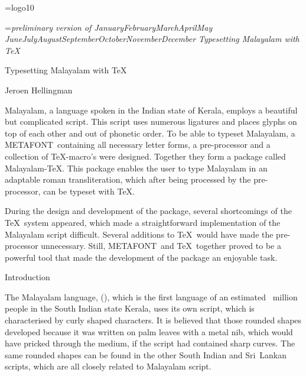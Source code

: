 



\def\q{\hfill\quad}
\def\os{\oldstyle}
\font\logo=logo10
\def\MF{{\logo METAFONT}}
\parindent=0pt

\def\today{\number\day\space\ifcase\month\or January\or February\or March\or April\or May\or
        June\or July\or August\or September\or October\or November\or December\fi
        \space\number\year}

\headline={{\it preliminary version of \today \hfil Typesetting Malayalam with \TeX}}


\centerline{\twelvebf Typesetting Malayalam with \TeX}\bigskip
\centerline{Jeroen Hellingman}\bigskip

{\narrower
{}\medskip

\noindent Malayalam, a language spoken in the Indian state of Kerala, 
employs a beautiful but complicated script. This script uses numerous 
ligatures and places glyphs on top of each other and out of phonetic 
order. To be able to typeset Malayalam, a \MF\ containing all 
necessary letter forms, a pre-processor and a collection of
\TeX-macro's were designed. Together they form a package called 
Malayalam-\TeX. This package enables the user to type Malayalam in an 
adaptable roman transliteration, which after being processed by the 
pre-processor, can be typeset with \TeX.

During the design and development of the package, several shortcomings 
of the \TeX\ system appeared, which made a straightforward 
implementation of the Malayalam script difficult. Several additions to 
\TeX\ would have made the pre-processor unnecessary. Still, \MF\ and 
\TeX\ together proved to be a powerful tool that made the development 
of the package an enjoyable task.\par}

\beginsection Introduction

The Malayalam language, ({\mm {}}), which is the first language of 
an estimated {\os30}~million people in the South Indian state Kerala, 
uses its own script, which is characterised by curly shaped 
characters. It is believed that those rounded shapes developed because 
it was written on palm leaves with a metal nib, which would have 
pricked through the medium, if the script had contained sharp curves. 
The same rounded shapes can be found in the other South Indian and 
Sri~Lankan scripts, which are all closely related to Malayalam script.

